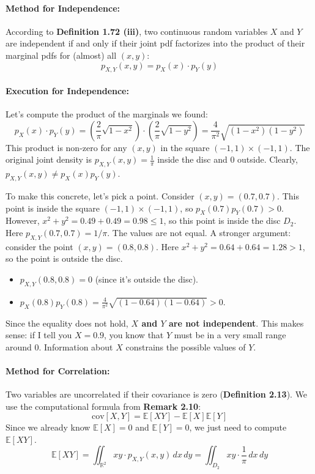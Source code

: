 \documentclass[11pt,a4paper]{article}
\theoremstyle{mystyle}
\begin{document}
\paragraph{Method for Independence:}
According to \textbf{Definition 1.72 (iii)}, two continuous random variables $X$ and $Y$ are independent if and only if their joint pdf factorizes into the product of their marginal pdfs for (almost) all $(x,y)$:
\[
p_{X,Y}(x,y) = p_X(x) \cdot p_Y(y)
\]

\paragraph{Execution for Independence:}
Let's compute the product of the marginals we found:
\[
p_X(x) \cdot p_Y(y) = \left(\frac{2}{\pi} \sqrt{1-x^2}\right) \cdot \left(\frac{2}{\pi} \sqrt{1-y^2}\right) = \frac{4}{\pi^2} \sqrt{(1-x^2)(1-y^2)}
\]
This product is non-zero for any $(x,y)$ in the square $(-1, 1) \times (-1, 1)$.
The original joint density is $p_{X,Y}(x,y) = \frac{1}{\pi}$ inside the disc and $0$ outside.
Clearly, $p_{X,Y}(x,y) \neq p_X(x) p_Y(y)$.

To make this concrete, let's pick a point. Consider $(x,y) = (0.7, 0.7)$.
This point is inside the square $(-1,1) \times (-1,1)$, so $p_X(0.7)p_Y(0.7) > 0$.
However, $x^2 + y^2 = 0.49 + 0.49 = 0.98 \leq 1$, so this point is inside the disc $D_2$. Here $p_{X,Y}(0.7, 0.7) = 1/\pi$. The values are not equal.
A stronger argument: consider the point $(x,y)=(0.8, 0.8)$. Here $x^2+y^2 = 0.64+0.64=1.28 > 1$, so the point is outside the disc.
\begin{itemize}
    \item $p_{X,Y}(0.8, 0.8) = 0$ (since it's outside the disc).
    \item $p_X(0.8) p_Y(0.8) = \frac{4}{\pi^2}\sqrt{(1-0.64)(1-0.64)} > 0$.
\end{itemize}
Since the equality does not hold, \textbf{$X$ and $Y$ are not independent}. This makes sense: if I tell you $X=0.9$, you know that $Y$ must be in a very small range around 0. Information about $X$ constrains the possible values of $Y$.

\paragraph{Method for Correlation:}
Two variables are uncorrelated if their covariance is zero (\textbf{Definition 2.13}). We use the computational formula from \textbf{Remark 2.10}:
\[
\text{cov}[X,Y] = \mathbb{E}[XY] - \mathbb{E}[X]\mathbb{E}[Y]
\]
Since we already know $\mathbb{E}[X]=0$ and $\mathbb{E}[Y]=0$, we just need to compute $\mathbb{E}[XY]$.
\[
\mathbb{E}[XY] = \iint_{\mathbb{R}^2} xy \cdot p_{X,Y}(x,y) \,dx\,dy = \iint_{D_2} xy \cdot \frac{1}{\pi} \,dx\,dy
\]
\end{document}
